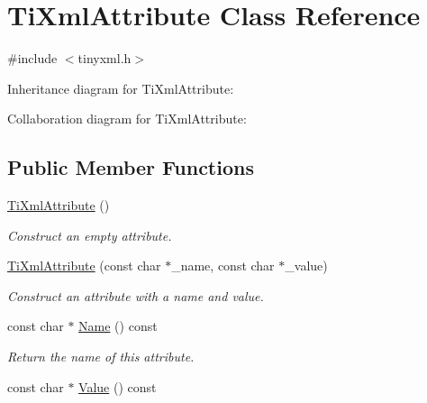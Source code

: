 \hypertarget{class_ti_xml_attribute}{\section{Ti\+Xml\+Attribute Class Reference}
\label{class_ti_xml_attribute}
}


{\ttfamily \#include $<$tinyxml.\+h$>$}



Inheritance diagram for Ti\+Xml\+Attribute\+:


Collaboration diagram for Ti\+Xml\+Attribute\+:
\subsection*{Public Member Functions}
\begin{DoxyCompactItemize}
\item 
\hypertarget{class_ti_xml_attribute_a9cfa3c8179873fd485d83003b114f8e1}{\hyperlink{class_ti_xml_attribute_a9cfa3c8179873fd485d83003b114f8e1}{Ti\+Xml\+Attribute} ()}\label{class_ti_xml_attribute_a9cfa3c8179873fd485d83003b114f8e1}

\begin{DoxyCompactList}\small\item\em Construct an empty attribute. \end{DoxyCompactList}\item 
\hypertarget{class_ti_xml_attribute_a759d0b76fb8fcf765ecab243bc14f05e}{\hyperlink{class_ti_xml_attribute_a759d0b76fb8fcf765ecab243bc14f05e}{Ti\+Xml\+Attribute} (const char $\ast$\+\_\+name, const char $\ast$\+\_\+value)}\label{class_ti_xml_attribute_a759d0b76fb8fcf765ecab243bc14f05e}

\begin{DoxyCompactList}\small\item\em Construct an attribute with a name and value. \end{DoxyCompactList}\item 
\hypertarget{class_ti_xml_attribute_a298a57287d305904ba6bd96ae6f78d3d}{const char $\ast$ \hyperlink{class_ti_xml_attribute_a298a57287d305904ba6bd96ae6f78d3d}{Name} () const }\label{class_ti_xml_attribute_a298a57287d305904ba6bd96ae6f78d3d}

\begin{DoxyCompactList}\small\item\em Return the name of this attribute. \end{DoxyCompactList}\item 
\hypertarget{class_ti_xml_attribute_a0f874490eac8ca00ee0070765d0e97e3}{const char $\ast$ \hyperlink{class_ti_xml_attribute_a0f874490eac8ca00ee0070765d0e97e3}{Value} () const }\label{class_ti_xml_attribute_a0f874490eac8ca00ee0070765d0e97e3}


\end{DoxyCompactItemize}
